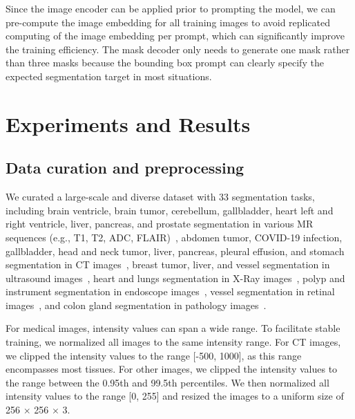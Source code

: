 \documentclass[runningheads]{llncs}
\begin{document}
Since the image encoder can be applied prior to prompting the model, we can pre-compute the image embedding for all training images to avoid replicated computing of the image embedding per prompt, which can significantly improve the training efficiency. The mask decoder only needs to generate one mask rather than three masks because the bounding box prompt can clearly specify the expected segmentation target in most situations. 


\section{Experiments and Results}
\subsection{Data curation and preprocessing}
We curated a large-scale and diverse dataset with 33 segmentation tasks, including brain ventricle, brain tumor, cerebellum, gallbladder, heart left and right ventricle, liver, pancreas, and prostate segmentation in various MR sequences (e.g., T1, T2, ADC, FLAIR)~\cite{AMOS22}\cite{MMs2020}\cite{ACDC}\cite{ABCs-MICCAI20}\cite{bakas2018brats}\cite{nci_prostate_dataset}\cite{PROMISE12}\cite{MSD-Dataset}, abdomen tumor, COVID-19 infection, gallbladder, head and neck tumor, liver, pancreas, pleural effusion, and stomach segmentation in CT images~\cite{Ma-2020-abdomenCT-1K}\cite{KiTS2021MIA}\cite{LiTS}\cite{FLARE21-MIA}\cite{ma2021-COVID-Data}\cite{MSD-Dataset}\cite{HECKTOR2021overview}\cite{NSCLC1}\cite{NSCLC2}\cite{TCIA}, breast tumor, liver, and vessel segmentation in ultrasound images~\cite{BUSIDataset}\cite{US-abdomen-data}, heart and lungs segmentation in X-Ray images~\cite{XRay-JSRT}, polyp and instrument segmentation in endoscope images~\cite{polyp-nature-data}\cite{Endo-instrument}, vessel segmentation in retinal images~\cite{DRIVE}, and colon gland segmentation in pathology images~\cite{gland-patho1}\cite{gland-patho2}.

For medical images, intensity values can span a wide range. To facilitate stable training, we normalized all images to the same intensity range. For CT images, we clipped the intensity values to the range [-500, 1000], as this range encompasses most tissues. For other images, we clipped the intensity values to the range between the 0.95th and 99.5th percentiles. We then normalized all intensity values to the range [0, 255] and resized the images to a uniform size of 256 $\times$ 256 $\times$ 3.
\end{document}
